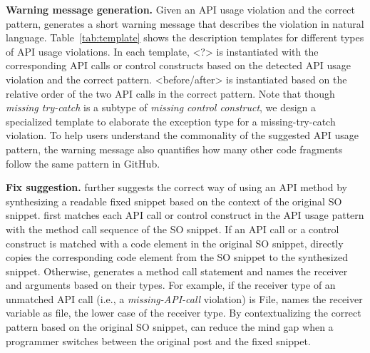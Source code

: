 
{\bf Warning message generation.} Given an API usage violation and the correct pattern, {\tool} generates a short warning message that describes the violation in natural language. Table~\ref{tab:template} shows the description templates for different types of API usage violations. In each template, {\textless?\textgreater} is instantiated with the corresponding API calls or control constructs based on the detected API usage violation and the correct pattern. {\textless before/after\textgreater} is instantiated based on the relative order of the two API calls in the correct pattern. Note that though {\em missing try-catch} is a subtype of {\em missing control construct}, we design a specialized template to elaborate the exception type for a missing-try-catch violation. To help users understand the commonality of the suggested API usage pattern, the warning message also quantifies how many other code fragments follow the same pattern in GitHub. 

{\bf Fix suggestion.} {\tool} further suggests the correct way of using an API method by synthesizing a readable fixed snippet based on the context of the original SO snippet. {\tool} first matches each API call or control construct in the API usage pattern with the method call sequence of the SO snippet. If an API call or a control construct is matched with a code element in the original SO snippet, {\tool} directly copies the corresponding code element from the SO snippet to the synthesized snippet. Otherwise, {\tool} generates a method call statement and names the receiver and arguments based on their types. For example, if the receiver type of an unmatched API call (i.e., a {\em missing-API-call} violation) is {\ttt File}, {\tool} names the receiver variable as {\ttt file}, the lower case of the receiver type. By contextualizing the correct pattern based on the original SO snippet, {\tool} can reduce the mind gap when a programmer switches between the original post and the fixed snippet.

